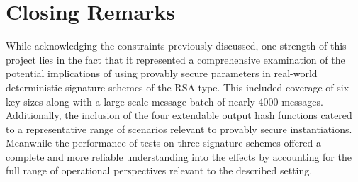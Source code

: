 \documentclass[]{final_report}
\theoremstyle{definition}
\begin{document}

\section{Closing Remarks}

While acknowledging the constraints previously discussed, one strength of this project lies in the fact that it represented a comprehensive examination of the potential implications of using provably secure parameters in real-world deterministic signature schemes of the RSA type. 
This included coverage of six key sizes along with a large scale message batch of nearly 4000 messages. Additionally, the inclusion of the four extendable output hash functions catered to a representative range of scenarios relevant to provably secure instantiations. Meanwhile the performance of tests on three signature schemes offered a complete and more reliable understanding into the effects by accounting for the full range of operational perspectives relevant to the described setting.
\end{document}

